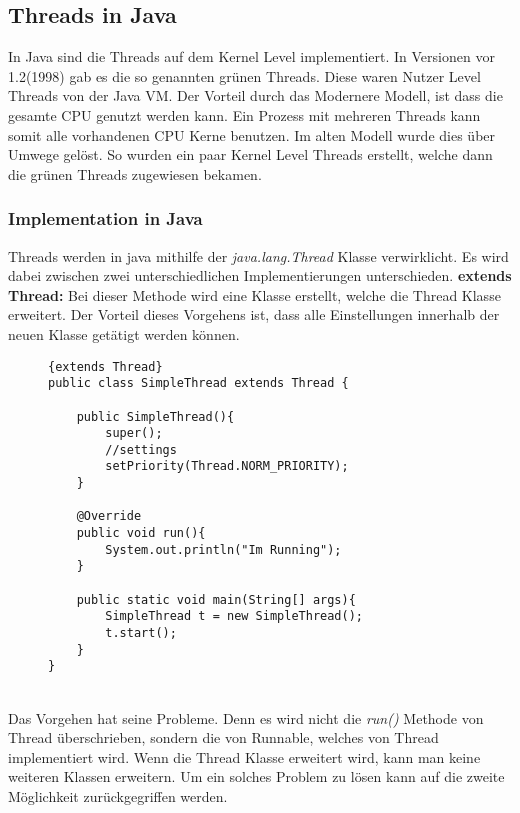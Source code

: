 \subsection{Threads in Java}
In Java sind die Threads auf dem Kernel Level implementiert. In Versionen vor 1.2(1998) gab es die so genannten grünen Threads. Diese waren Nutzer Level Threads von der Java VM. Der Vorteil durch das Modernere Modell, ist dass die gesamte CPU genutzt werden kann. Ein Prozess mit mehreren Threads kann somit alle vorhandenen CPU Kerne benutzen. Im alten Modell wurde dies über Umwege gelöst. So wurden ein paar Kernel Level Threads erstellt, welche dann die grünen Threads zugewiesen bekamen.\cite{Threads:Cox}
\subsubsection{Implementation in Java}
Threads werden in java mithilfe der \textit{java.lang.Thread} Klasse verwirklicht. Es wird dabei zwischen zwei unterschiedlichen Implementierungen unterschieden.
\smallskip
\newline
\textbf{extends Thread:} Bei dieser Methode wird eine Klasse erstellt, welche die Thread Klasse erweitert. Der Vorteil dieses Vorgehens ist, dass alle Einstellungen innerhalb der neuen Klasse getätigt werden können.\cite{Java:Thread}
\begin{figure}[h]
\begin{lstlisting}{extends Thread}
public class SimpleThread extends Thread {

    public SimpleThread(){
        super();
        //settings
        setPriority(Thread.NORM_PRIORITY);
    }

    @Override
    public void run(){
        System.out.println("Im Running");
    }

    public static void main(String[] args){
        SimpleThread t = new SimpleThread();
        t.start();
    }
}
\end{lstlisting}
\end{figure}
\\Das Vorgehen hat seine Probleme. Denn es wird nicht die \textit{run()} Methode von Thread überschrieben, sondern die von Runnable, welches von Thread implementiert wird. Wenn die Thread Klasse erweitert wird, kann man keine weiteren Klassen erweitern. Um ein solches Problem zu lösen kann auf die zweite Möglichkeit zurückgegriffen werden.
